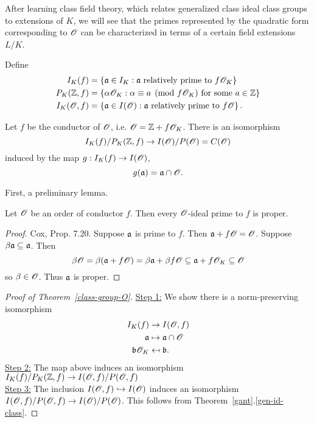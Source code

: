 After learning class field theory, which relates generalized class ideal class groups to extensions of $K$, we will see that the primes represented by the quadratic form corresponding to $\mathscr{O}$ can be characterized in terms of a certain field extensions $L/K$. 

\begin{df}
Define
\begin{align*}
I_K(f)&=%
\set{\ma\in I_K}{\ma\text{ relatively prime to }f\sO_K}\\
P_{K}(\Z,f)&=\set{\al\sO_K}{\al\equiv a\pmod{f\sO_K}\text{ for some }a\in \Z}\\
I_K(\sO,f)&=\set{\ma\in I(\sO)}{\ma\text{ relatively prime to }f\sO}.
\end{align*}
\end{df}
\begin{thm}
Let $f$ be the conductor of $\mathscr{O}$, i.e. $\mathscr{O}=\mathbb{Z}+f\mathscr{O}_K$. 
There is an isomorphism
\[
I_K(f)/P_K(\mathbb{Z},f)\to I(\mathscr{O})/P(\mathscr{O})=C(\mathscr{O})
\]
induced by the map $g:I_K(f)\to I(\mathscr{O})$,
\[
g(\mathfrak{a})=\mathfrak{a}\cap \mathscr{O}.
\]
\end{thm}
First, a preliminary lemma.
\begin{lem}
Let $\mathscr{O}$ be an order of conductor $f$. Then every $\mathscr{O}$-ideal prime to $f$ is proper.
\end{lem}
\begin{proof}
Cox, Prop. 7.20.
Suppose $\mathfrak{a}$ is prime to $f$. Then $\mathfrak{a}+f\mathscr{O}=\mathscr{O}$. Suppose $\beta\mathfrak{a}\subseteq \mathfrak{a}$. Then
\[
\beta \mathscr{O}=\beta(\mathfrak{a}+f\mathscr{O})=\beta \mathfrak{a} +\beta f\mathscr{O}\subseteq \mathfrak{a}+f\mathscr{O}_K\subseteq \mathscr{O}
\]
so $\beta \in \mathscr{O}$. Thus $\mathfrak{a}$ is proper.
\end{proof}
\begin{proof}[Proof of Theorem~\ref{class-group-O}]
\noindent\underline{Step 1:} We show there is a norm-preserving isomorphism 
\begin{align*}
I_K(f)&\to I(\mathscr{O},f)\\
\mathfrak{a}&\mapsto \mathfrak{a}\cap \mathscr{O}\\
\mathfrak{b}\mathscr{O}_K&\mapsfrom \mathfrak{b}.
\end{align*}
\noindent\underline{Step 2:} The map above induces an isomorphism $I_K(f)/P_K(\mathbb{Z},f)\to I(\mathscr{O},f)/P(\mathscr{O},f)$\\

\noindent\underline{Step 3:} The inclusion $I(\mathscr{O},f)\hookrightarrow I(\mathscr{O})$ induces an isomorphism $I(\mathscr{O},f)/P(\mathscr{O},f)\to I(\mathscr{O})/P(\mathscr{O})$. This follows from Theorem~\ref{gant}.\ref{gen-id-class}.
\end{proof}
